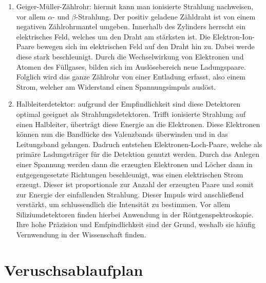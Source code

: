 \documentclass{article}
\begin{document}
\begin{enumerate}
    \item Geiger-Müller-Zählrohr: hiermit kann man ionisierte Strahlung nachweisen, vor allem $\alpha$- und $\beta$-Strahlung. Der positiv geladene Zähldraht ist von einem negativen Zählrohrmantel umgeben. Innerhalb des Zylinders herrscht ein elektrisches Feld, welches um den Draht am stärksten ist. Die Elektron-Ion-Paare bewegen sich im elektrischen Feld auf den Draht hin zu. Dabei werde diese stark beschleunigt. Durch die Wechselwirkung von Elektronen und Atomen des Füllgases, bilden sich im Auslösebereich neue Ladungspaare. Folglich wird das ganze Zählrohr von einer Entladung erfasst, also einem Strom, welcher am Widerstand einen Spannungsimpuls auslöst. 
    \item Halbleiterdetektor: aufgrund der Empfindlichkeit sind diese Detektoren optimal geeignet als Strahlungsdetektoren. Trifft ionisierte Strahlung auf einen Halbleiter, überträgt diese Energie an die Elektronen. Diese Elektronen können nun die Bandlücke des Valenzbands überwinden und in das Leitungsband gelangen. Dadruch entstehen Elektronen-Loch-Paare, welche als primäre Ladungsträger für die Detektion genutzt werden. Durch das Anlegen einer Spannung werden dann die erzeugten Elektronen und Löcher dann in entgegengesetzte Richtungen beschleunigt, was einen elektrischen Strom erzeugt. Dieser ist proportionale zur Anzahl der erzeugten Paare und somit zur Energie der einfallenden Strahlung. Dieser Impuls wird anschließend verstärkt, um schlussendlich die Intensität zu bestimmen. Vor allem Siliziumdetektoren finden hierbei Anwendung in der Röntgenspektroskopie. Ihre hohe Präzision und Emfpindlichkeit sind der Grund, weshalb sie häufig Vernwendung in der Wissenschaft finden.
\end{enumerate}

\newpage





\section{Veruschsablaufplan}
\end{document}

